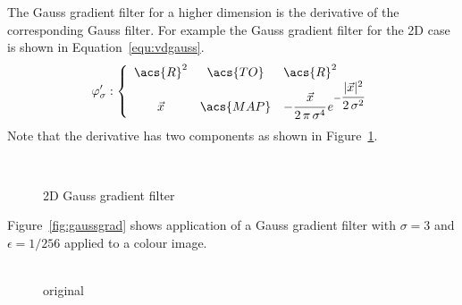 \documentclass[12pt,a4paper,oneside,openright]{book}
\newcommand{\Eg}{For ex\-am\-ple }
\newcommand{\equ}[1]{Equation~\ref{equ:#1}}
\newcommand{\fig}[1]{Figure~\ref{fig:#1}}
\begin{document}
\begin{CJK}{UTF8}{}
The Gauss gradient filter for a higher dimension is the derivative of the corresponding Gauss filter. \Eg the Gauss gradient filter for the \ac{2D} case is shown in \equ{vdgauss}.
\begin{equation}\label{equ:vdgauss}
  \varphi^\prime_\sigma:\left\{\begin{array}{ccl}\acs{R}^2&\acs{TO}&\acs{R}^2\\\vec{x}&\acs{MAP}&-\cfrac{\vec{x}}{2\,\pi\,\sigma^4}\,e^{-\cfrac{|\vec{x}|^2}{2\,\sigma^2}}\end{array}\right.
\end{equation}
Note that the derivative has two components as shown in \fig{dgauss}.
\begin{figure}[htbp]
  \begin{center}
    \ 
    \caption{\acs{2D} Gauss gradient filter\label{fig:dgauss}}
  \end{center}
\end{figure}
\fig{gaussgrad} shows application of a Gauss gradient filter with $\sigma=3$ and $\epsilon=1/256$ applied to a colour image.
\begin{figure}[htbp]
   \begin{center}
     \begin{minipage}[t]{.24\textwidth}
       \begin{center}
         \\
         original
       \end{center}
     \end{minipage}
     \begin{minipage}[t]{.24\textwidth}
       \begin{center}
         \\

\end{center}
\end{minipage}
\end{center}
\end{figure}
\end{CJK}
\end{document}

